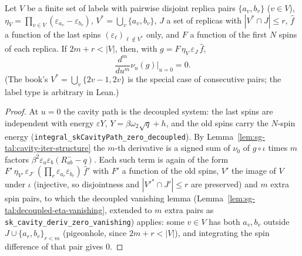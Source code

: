 \begin{lemma}\label{lem:sg-tal:cavity-deriv-zero-vanishing}
\leanok
{}
Let $V$ be a finite set of labels with pairwise disjoint replica pairs $\{a_v,b_v\}$ ($v\in V$), $\eta_V=\prod_{v\in V}(\varepsilon_{a_v}-\varepsilon_{b_v})$, $V^*=\bigcup_v\{a_v,b_v\}$, $J$ a set of replicas with $|V^*\cap J|\le r$, $\hat f$ a function of the last spins $(\varepsilon_\ell)_{\ell\notin V^*}$ only, and $F$ a function of the first $N$ spins of each replica. If $2m+r<|V|$, then, with $g=F\,\eta_V\,\varepsilon_J\,\hat f$,
\[
\frac{d^m}{du^m}\nu_u(g)\Big|_{u=0}=0 .
\]
(The book's $V^*=\bigcup_v\{2v-1,2v\}$ is the special case of consecutive pairs; the label type is arbitrary in Lean.)
\end{lemma}
\begin{proof}
\leanok
At $u=0$ the cavity path is the decoupled system: the last spins are independent with energy $\varepsilon Y$, $Y=\beta\omega_2\sqrt q+h$, and the old spins carry the $N$-spin energy (\texttt{integral\_skCavityPath\_zero\_decoupled}). By Lemma~\ref{lem:sg-tal:cavity-iter-structure} the $m$-th derivative is a signed sum of $\nu_0$ of $g\circ\iota$ times $m$ factors $\beta^2\varepsilon_a\varepsilon_b(R^-_{ab}-q)$. Each such term is again of the form $F'\,\eta_{V'}\,\varepsilon_{J'}\,(\prod_r\varepsilon_{a_r}\varepsilon_{b_r})\,\hat f'$ with $F'$ a function of the old spins, $V'$ the image of $V$ under $\iota$ (injective, so disjointness and $|V'^*\cap J'|\le r$ are preserved) and $m$ extra spin pairs, to which the decoupled vanishing lemma (Lemma~\ref{lem:sg-tal:decoupled-eta-vanishing}, extended to $m$ extra pairs as \texttt{sk\_cavity\_deriv\_zero\_vanishing}) applies: some $v\in V$ has both $a_v,b_v$ outside $J\cup\{a_r,b_r\}_{r<m}$ (pigeonhole, since $2m+r<|V|$), and integrating the spin difference of that pair gives $0$.
\end{proof}

